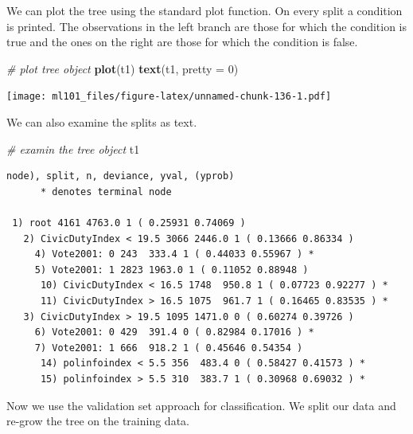 \documentclass[]{article}
\newenvironment{Shaded}{\begin{snugshade}}{\end{snugshade}}
\newcommand{\CommentTok}[1]{\textcolor[rgb]{0.56,0.35,0.01}{\textit{#1}}}
\newcommand{\DataTypeTok}[1]{\textcolor[rgb]{0.13,0.29,0.53}{#1}}
\newcommand{\DecValTok}[1]{\textcolor[rgb]{0.00,0.00,0.81}{#1}}
\newcommand{\KeywordTok}[1]{\textcolor[rgb]{0.13,0.29,0.53}{\textbf{#1}}}
\newcommand{\NormalTok}[1]{#1}
\begin{document}
We can plot the tree using the standard plot function. On every split a condition is printed. The observations in the left branch are those for which the condition is true and the ones on the right are those for which the condition is false.

\begin{Shaded}
\begin{Highlighting}[]
\CommentTok{# plot tree object}
\KeywordTok{plot}\NormalTok{(t1)}
\KeywordTok{text}\NormalTok{(t1, }\DataTypeTok{pretty =} \DecValTok{0}\NormalTok{)}
\end{Highlighting}
\end{Shaded}

\texttt{[image: ml101\_files/figure-latex/unnamed-chunk-136-1.pdf]}

We can also examine the splits as text.

\begin{Shaded}
\begin{Highlighting}[]
\CommentTok{# examin the tree object}
\NormalTok{t1}
\end{Highlighting}
\end{Shaded}

\begin{verbatim}
node), split, n, deviance, yval, (yprob)
      * denotes terminal node

 1) root 4161 4763.0 1 ( 0.25931 0.74069 )  
   2) CivicDutyIndex < 19.5 3066 2446.0 1 ( 0.13666 0.86334 )  
     4) Vote2001: 0 243  333.4 1 ( 0.44033 0.55967 ) *
     5) Vote2001: 1 2823 1963.0 1 ( 0.11052 0.88948 )  
      10) CivicDutyIndex < 16.5 1748  950.8 1 ( 0.07723 0.92277 ) *
      11) CivicDutyIndex > 16.5 1075  961.7 1 ( 0.16465 0.83535 ) *
   3) CivicDutyIndex > 19.5 1095 1471.0 0 ( 0.60274 0.39726 )  
     6) Vote2001: 0 429  391.4 0 ( 0.82984 0.17016 ) *
     7) Vote2001: 1 666  918.2 1 ( 0.45646 0.54354 )  
      14) polinfoindex < 5.5 356  483.4 0 ( 0.58427 0.41573 ) *
      15) polinfoindex > 5.5 310  383.7 1 ( 0.30968 0.69032 ) *
\end{verbatim}

Now we use the validation set approach for classification. We split our data and re-grow the tree on the training data.
\end{document}
